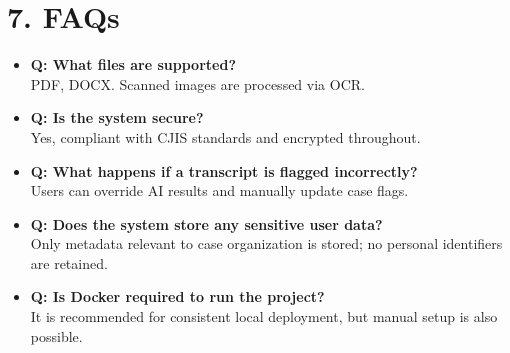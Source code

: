 \documentclass[11pt]{article}
\begin{document}
\section*{7. FAQs}
\begin{itemize}
    \item \textbf{Q: What files are supported?} \\
    PDF, DOCX. Scanned images are processed via OCR.
    \item \textbf{Q: Is the system secure?} \\
    Yes, compliant with CJIS standards and encrypted throughout.
    \item \textbf{Q: What happens if a transcript is flagged incorrectly?} \\
    Users can override AI results and manually update case flags.
    \item \textbf{Q: Does the system store any sensitive user data?} \\
    Only metadata relevant to case organization is stored; no personal identifiers are retained.
    \item \textbf{Q: Is Docker required to run the project?} \\
    It is recommended for consistent local deployment, but manual setup is also possible.
    
\end{itemize}
\end{document}
